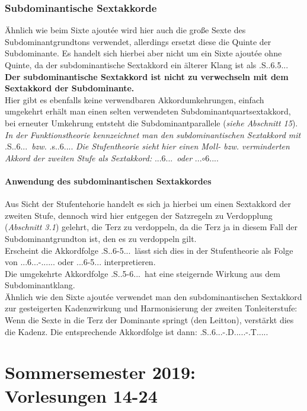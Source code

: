 \documentclass[a4paper]{article}
\newcommand{\dS}[1]{\HH.\uppercase\expandafter{\romannumeral #1\relax}.....} %
\newcommand{\dShoch}[4]{\HH.\uppercase\expandafter{\romannumeral #1\relax}..#2.#3.#4.} %
\newcommand{\mShoch}[4]{\HH.\romannumeral #1..#2.#3.#4.} %
\newcommand{\T}{\HH.T.....}
\newcommand{\SA}{\HH.S..6.5..} %
\newcommand{\Shoch}[2]{\HH.S.#2.#1...}
\newcommand{\D}{\HH.D.....}
\newcommand{\Shochm}[2]{\HH.s.#2.#1...}
\begin{document}
	\section{Subdominantische Sextakkorde}
	Ähnlich wie beim Sixte ajoutée wird hier auch die große Sexte des Subdominantgrundtons verwendet, allerdings ersetzt diese die Quinte der Subdominante. Es handelt sich hierbei aber nicht um ein Sixte ajoutée ohne Quinte, da der subdominantische Sextakkord ein älterer Klang ist als \SA.\\
	\textbf{Der subdominantische Sextakkord ist nicht zu verwechseln mit dem Sextakkord der Subdominante.}\\
	Hier gibt es ebenfalls keine verwendbaren Akkordumkehrungen, einfach umgekehrt erhält man einen selten verwendeten Subdominantquartsextakkord, bei erneuter Umkehrung entsteht die Subdominantparallele (\textit{siehe Abschnitt 15}).\\
	\textit{In der Funktionstheorie kennzeichnet man den subdominantischen Sextakkord mit} \Shoch{6}{}\ \textit{bzw.} \Shochm{6}{}. \textit{Die Stufentheorie sieht hier einen Moll- bzw. verminderten Akkord der zweiten Stufe als Sextakkord:} \mShoch{2}{6}{}{}\ \textit{oder} \mShoch{2}{$\circ$6}{}{}.
	
	\subsection{Anwendung des subdominantischen Sextakkordes}
	Aus Sicht der Stufentehorie handelt es sich ja hierbei um einen Sextakkord der zweiten Stufe, dennoch wird hier entgegen der Satzregeln zu Verdopplung (\textit{Abschnitt 3.1}) gelehrt, die Terz zu verdoppeln, da die Terz ja in diesem Fall der Subdominantgrundton ist, den es zu verdoppeln gilt.\\
	Erscheint die Akkordfolge \Shoch{6-5}{}\ lässt sich dies in der Stufentheorie als Folge von 
	\mShoch{2}{6}{}{}-\dS{4} oder \dShoch{4}{6-5}{}{} interpretieren.\\
	Die umgekehrte Akkordfolge \Shoch{5-6}{}\ hat eine steigernde Wirkung aus dem Subdominantklang.\\
	Ähnlich wie den Sixte ajoutée verwendet man den subdominantischen Sextakkord zur gesteigerten Kadenzwirkung und Harmonisierung der zweiten Tonleiterstufe: Wenn die Sexte in die Terz der Dominante springt (den Leitton), verstärkt dies die Kadenz. Die entsprechende Akkordfolge ist dann: \Shoch{6}{}-\D-\T
	
	\part{Sommersemester 2019: Vorlesungen 14-24}
	
\end{document}
